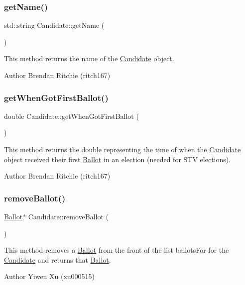 \subsubsection{\texorpdfstring{get\+Name()}{getName()}}
{\footnotesize\ttfamily std\+::string Candidate\+::get\+Name (\begin{DoxyParamCaption}{ }\end{DoxyParamCaption})}

This method returns the name of the \hyperlink{classCandidate}{Candidate} object. \begin{DoxyAuthor}{Author}
Brendan Ritchie (ritch167) 
\end{DoxyAuthor}
\mbox{\label{classCandidate_acb99e3ce6e39413c36b1181f67b870ff}} 
\subsubsection{\texorpdfstring{get\+When\+Got\+First\+Ballot()}{getWhenGotFirstBallot()}}
{\footnotesize\ttfamily double Candidate\+::get\+When\+Got\+First\+Ballot (\begin{DoxyParamCaption}{ }\end{DoxyParamCaption})}

This method returns the double representing the time of when the \hyperlink{classCandidate}{Candidate} object received their first \hyperlink{classBallot}{Ballot} in an election (needed for S\+TV elections). \begin{DoxyAuthor}{Author}
Brendan Ritchie (ritch167) 
\end{DoxyAuthor}
\mbox{\label{classCandidate_a329eae2002b3584594dd10c92b5f6f51}} 
\subsubsection{\texorpdfstring{remove\+Ballot()}{removeBallot()}}
{\footnotesize\ttfamily \hyperlink{classBallot}{Ballot}$\ast$ Candidate\+::remove\+Ballot (\begin{DoxyParamCaption}{ }\end{DoxyParamCaption})}

This method removes a \hyperlink{classBallot}{Ballot} from the front of the list ballots\+For for the \hyperlink{classCandidate}{Candidate} and returns that \hyperlink{classBallot}{Ballot}. \begin{DoxyAuthor}{Author}
Yiwen Xu (xu000515) 
\end{DoxyAuthor}
\mbox{\label{classCandidate_a9b407c109b00124423fbe4a722a503c2}} 
